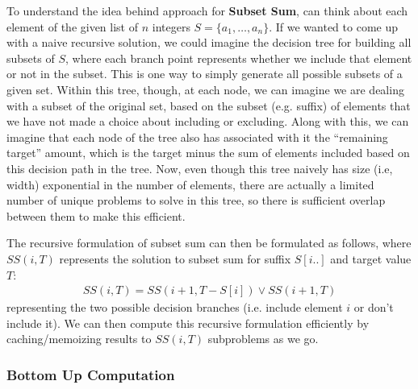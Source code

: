 \documentclass[10pt,a4paper]{article}
\begin{document}
To understand the idea behind approach for \textbf{Subset Sum}, can think about each element of the given list of $n$ integers $S=\{a_1,\dots,a_n\}$. If we wanted to come up with a naive recursive solution, we could imagine the decision tree for building all subsets of $S$, where each branch point represents whether we include that element or not in the subset. This is one way to simply generate all possible subsets of a given set. Within this tree, though, at each node, we can imagine we are dealing with a subset of the original set, based on the subset (e.g. suffix) of elements that we have not made a choice about including or excluding. Along with this, we can imagine that each node of the tree also has associated with it the ``remaining target'' amount, which is the target minus the sum of elements included based on this decision path in the tree. Now, even though this tree naively has size (i.e, width) exponential in the number of elements, there are actually a limited number of unique problems to solve in this tree, so there is sufficient overlap between them to make this efficient.

The recursive formulation of subset sum can then be formulated as follows, where $SS(i,T)$ represents the solution to subset sum for suffix $S[i..]$ and target value $T$:
\begin{align*}
    SS(i, T) = SS(i+1, T-S[i]) \vee SS(i+1, T)
\end{align*}
representing the two possible decision branches (i.e. include element $i$ or don't include it). We can then compute this recursive formulation efficiently by caching/memoizing results to $SS(i,T)$ subproblems as we go.



\subsubsection*{Bottom Up Computation}
\end{document}
